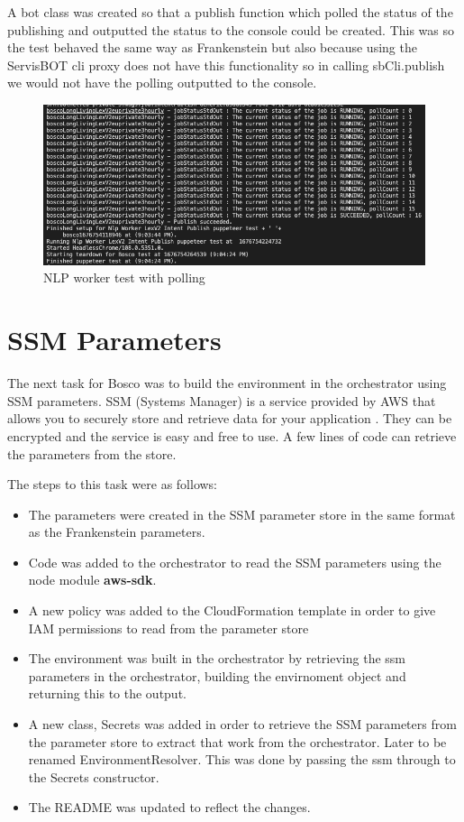 \documentclass[12pt,a4paper,titlepage]{report}
\begin{document}
A bot class was created so that a publish function which polled the status of the publishing and outputted the status to the console could be created. This was so 
the test behaved the same way as Frankenstein but also because using the ServisBOT cli proxy does not have this functionality so in calling sbCli.publish we would 
not have the polling outputted to the console.

\begin{figure}[H]
 \centering
 \includegraphics[width=15cm]{./diagrams/nlp_worker_poll.png}
 \caption{NLP worker test with polling}
\end{figure}

\section{SSM Parameters}
The next task for Bosco was to build the environment in the orchestrator using SSM parameters. 
SSM (Systems Manager) is a service provided by AWS that allows you to securely store and retrieve data for your application \cite{Halley}.
They can be encrypted and the service is easy and free to use. 
A few lines of code can retrieve the parameters from the store. 

The steps to this task were as follows:
\begin{itemize}
\item The parameters were created in the SSM parameter store in the same format as the Frankenstein parameters.
\item Code was added to the orchestrator to read the SSM parameters using the node module \textbf{aws-sdk}.
\item A new policy was added to the  CloudFormation template in order to give IAM permissions to read from the parameter store
\item The environment was built in the orchestrator by retrieving the ssm parameters in the orchestrator, building the envirnoment object and returning this to the output.
\item A new class, Secrets was added in order to retrieve the SSM parameters from the parameter store to extract that work from the orchestrator. Later to be renamed EnvironmentResolver. This was done by passing the ssm through to the Secrets constructor.
\item The README was updated to reflect the changes.
\end{itemize}
\end{document}
